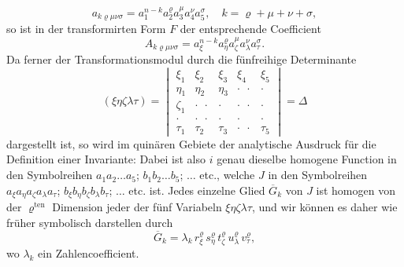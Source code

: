\[
a_{k\varrho\mu\nu\sigma} = a_1^{n-k} a_2^\varrho a_3^\mu a_4^\nu a_5^\sigma, \quad k = \varrho + \mu + \nu + \sigma,
\]
so ist in der transformirten Form $F$ der entsprechende Coefficient
\[
A_{k\varrho\mu\nu\sigma} = a_\xi^{n-k} a_\eta^\varrho a_\zeta^\mu a_\lambda^\nu a_\tau^\sigma.
\]
Da ferner der Transformationsmodul durch die fünfreihige Determinante
\[
(\xi\eta\zeta\lambda\tau) =
\begin{vmatrix}
\xi_1 & \xi_2 & \xi_3 & \xi_4 & \xi_5\\
\eta_1 & \eta_2 & \eta_3 & \cdot\ \ \cdot & \cdot\\
\zeta_1 & \cdot\ \ \cdot & \cdot & \cdot\ \ \cdot & \cdot\\
\cdot & \cdot\ \ \cdot & \cdot & \cdot & \cdot\\
\tau_1 & \tau_2 & \tau_3 & \cdot\ \ \cdot & \tau_5
\end{vmatrix}
= \Delta %
\]
dargestellt ist, so wird im quinären Gebiete der analytische Ausdruck für die Definition einer Invariante:
Dabei ist also $i$ genau dieselbe homogene Function in den Symbolreihen $a_1 a_2 \ldots a_5$; $b_1 b_2 \ldots b_5$; $\ldots$ etc., welche $J$ in den Symbolreihen $a_\xi a_\eta a_\zeta a_\lambda a_\tau$; $b_\xi b_\eta b_\zeta b_\lambda b_\tau$; $\ldots$ etc. ist. Jedes einzelne Glied $\overline{G}_k$ von $J$ ist homogen von der $\varrho^{\text{ten}}$ Dimension jeder der fünf Variabeln $\xi\eta\zeta\lambda\tau$, und wir können es daher wie früher symbolisch darstellen durch
\[
\overline{G}_k = \lambda_k\, r_\xi^\varrho\, s_\eta^\varrho\, t_\zeta^\varrho\, u_\lambda^\varrho\, v_\tau^\varrho,
\]
wo $\lambda_k$ ein Zahlencoefficient.

